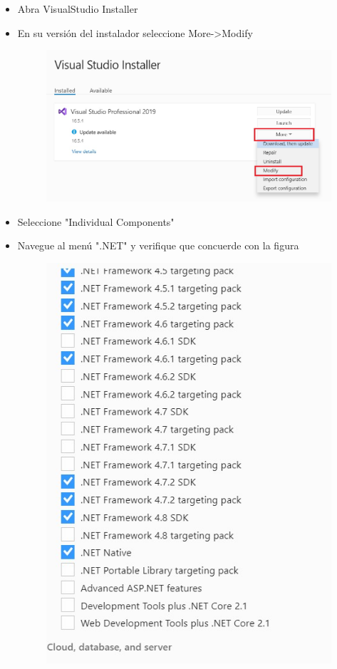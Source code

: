 \documentclass[letterpaper,12pt]{article}
\begin{document}
	\begin{itemize}
		\item  Abra VisualStudio Installer
		
		\item En su versión del instalador seleccione More->Modify
		\begin{figure}[H]
			\centering
			\includegraphics[width=0.7\linewidth]{images/Visual1}
			\label{fig:visual1}
		\end{figure}
		
		\item Seleccione "Individual Components"
		\item Navegue al menú ".NET" y verifique que concuerde con la figura
		\begin{figure}[H]
			\centering
			\includegraphics[width=0.7\linewidth]{images/Visual2}
			\label{fig:visual2}
		\end{figure}
		

\end{itemize}
\end{document}
